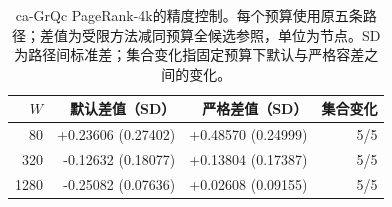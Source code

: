 \begin{table}[htbp]
\caption{ca-GrQc PageRank-4k的精度控制。每个预算使用原五条路径；差值为受限方法减同预算全候选参照，单位为节点。SD为路径间标准差；集合变化指固定预算下默认与严格容差之间的变化。}\label{tab:precision-output}
\centering\begin{tabular}{rrrr}\toprule
$W$ & 默认差值（SD） & 严格差值（SD） & 集合变化 \\ \midrule
80 & +0.23606 (0.27402) & +0.48570 (0.24999) & 5/5 \\
320 & -0.12632 (0.18077) & +0.13804 (0.17387) & 5/5 \\
1280 & -0.25082 (0.07636) & +0.02608 (0.09155) & 5/5 \\
\bottomrule\end{tabular}
\end{table}